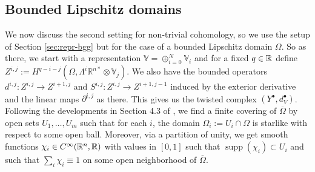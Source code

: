 \documentclass[11pt]{amsart}
\newcommand{\0}{\mathaccent23}
\newcommand\supp{\operatorname{supp}}
\newcommand{\bs}{{\scriptscriptstyle \bullet}}
\begin{document}
\subsection{Bounded Lipschitz domains}\label{sec:Lipschitz}
We now discuss the second setting for non-trivial cohomology, so we use the setup of Section \ref{sec:repr-bgg} but for the case of a bounded Lipschitz domain $\Omega$. So as there, we start with a representation $\mathbb V=\oplus_{i=0}^N\mathbb V_i$ and for a fixed $q\in\Bbb R$ define  $Z^{i,j}:=H^{q-i-j}(\Omega,\Lambda^i\mathbb R^{n*}\otimes\mathbb V_j)$. We also have the bounded operators $d^{i,j}:Z^{i,j}\to Z^{i+1,j}$ and $S^{i,j}:Z^{i,j}\to Z^{i+1,j-1}$ induced by the exterior derivative and the linear maps $\partial^{i,j}$ as there. This gives us the twisted complex $(Y^\bs,d^\bs_V)$. Following the developments in Section 4.3 of \cite{costabel2010bogovskiui}, we find a finite covering of $\overline{\Omega}$ by open sets $U_1,\dots,U_m$ such that for each $i$, the domain $\Omega_i:=U_i\cap\Omega$ is starlike with respect to some open ball. Moreover, via a partition of unity, we get smooth functions $\chi_i\in C^\infty(\Bbb R^n,\Bbb R)$ with values in $[0,1]$ such that $\supp(\chi_i)\subset U_i$ and such that $\sum_i \chi_i\equiv 1$ on some open neighborhood of $\overline{\Omega}$.
\end{document}
